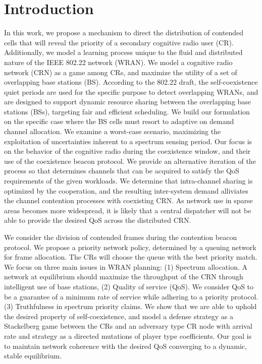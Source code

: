 \documentclass[10pt]{article}
\theoremstyle{definition}
\begin{document}
\section{Introduction}
In this work, we propose a mechanism to direct the distribution of contended
cells that will reveal the priority of a secondary cognitive radio user (CR).
Additionally, we model a learning process unique to the fluid and distributed
nature of the IEEE 802.22 network (WRAN). We model a cognitive radio network
(CRN) as a game among CRs, and maximize the utility of a set of overlapping base
stations (BS).
According to the 802.22 draft, the
self-coexistence quiet periods are used for the specific purpose to detect
overlapping WRANs, and are designed to support
dynamic resource sharing between the overlapping base stations (BSs), targeting
fair and efficient scheduling. We build our formulation on the specific case
where the BS cells must resort to adaptive on demand channel allocation. 
We examine a worst-case scenario, maximizing the
exploitation of uncertainties inherent to a spectrum sensing period.
Our focus is on the behavior of the cognitive radio during the
coexistence window, and their use of the coexistence beacon protocol. 
We provide an alternative
iteration of the process so that determines channels that can be acquired to satisfy the
QoS requirements of the given workloads. We determine that intra-channel sharing
is optimized by the cooperation, and the resulting inter-system demand
alliviates the channel contention processes with coexisting CRN. 
As network use in sparse areas becomes more widespread, it is likely that a central dispatcher will not be able
to provide the desired QoS across the distributed CRN. 

We consider the division of contended frames during the contention beacon
protocol. We propose a priority network policy, determined by a queuing network for frame
allocation. The CRs will choose the queue with the best priority match. 
We focus on three main issues in WRAN planning: (1) Spectrum allocation. A
network at equilibrium should maximize the throughput of the CRN through
intelligent use of base stations, (2) Quality of service (QoS). We consider QoS
to be a guarantee of a minimum rate of service while adhering to a priority
protocol. (3) Truthfulness in spectrum priority claims. 
We show that we are able to uphold
the desired property of self-coexistence, and model
a defense strategy as a Stackelberg game between the CRs and an adversary type
CR node with arrival rate and strategy as a directed mutations
of player type coefficients. Our goal is to maintain network coherence 
with the desired QoS converging to a dynamic, stable equilibrium. 
\end{document}
